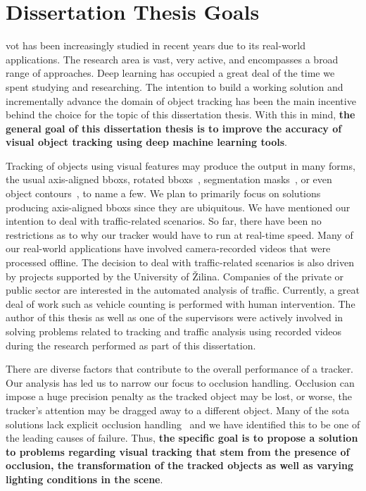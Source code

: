 \chapter{Dissertation Thesis Goals}
\label{chap:Goals}

\gls{vot} has been increasingly studied in recent years due to its real-world applications. The research area is vast, very active, and encompasses a broad range of approaches. Deep learning has occupied a great deal of the time we spent studying and researching. The intention to build a working solution and incrementally advance the domain of object tracking has been the main incentive behind the choice for the topic of this dissertation thesis. With this in mind, \textbf{the general goal of this dissertation thesis is to improve the accuracy of visual object tracking using deep machine learning tools}.

Tracking of objects using visual features may produce the output in many forms, the usual axis-aligned \glspl{bbox}, rotated \glspl{bbox}~\cite{chen2019rotbboxes}, segmentation masks~\cite{wang2019siammask}, or even object contours~\cite{yang2016encoderdecoder}, to name a few. We plan to primarily focus on solutions producing axis-aligned \glspl{bbox} since they are ubiquitous. We have mentioned our intention to deal with traffic-related scenarios. So far, there have been no restrictions as to why our tracker would have to run at real-time speed. Many of our real-world applications have involved camera-recorded videos that were processed offline. The decision to deal with traffic-related scenarios is also driven by projects supported by the University of Žilina. Companies of the private or public sector are interested in the automated analysis of traffic. Currently, a great deal of work such as vehicle counting is performed with human intervention. The author of this thesis as well as one of the supervisors were actively involved in solving problems related to tracking and traffic analysis using recorded videos during the research performed as part of this dissertation.

There are diverse factors that contribute to the overall performance of a tracker. Our analysis has led us to narrow our focus to occlusion handling. Occlusion can impose a huge precision penalty as the tracked object may be lost, or worse, the tracker's attention may be dragged away to a different object. Many of the \gls{sota} solutions lack explicit occlusion handling~\cite{guo2019siamcar, li2018siamrpn, wang2019siammask} and we have identified this to be one of the leading causes of failure. Thus, \textbf{the specific goal is to propose a solution to problems regarding visual tracking that stem from the presence of occlusion, the transformation of the tracked objects as well as varying lighting conditions in the scene}.

